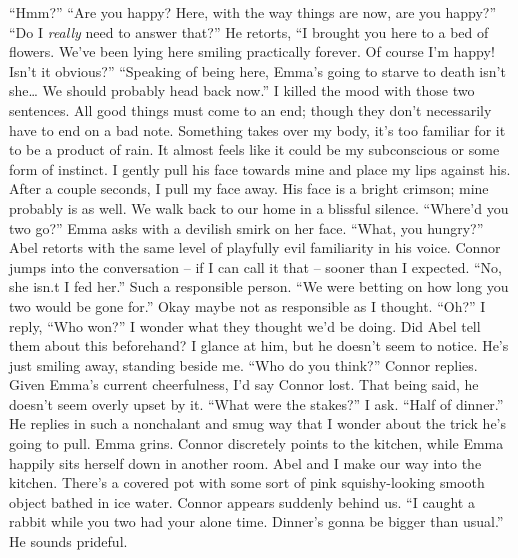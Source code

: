 \documentclass[openany, 12pt]{book}
\newcommand\tab[1][1cm]{\hspace*{#1}}
\begin{document}
\newline
\tab
``Hmm?''
\newline
\tab
``Are you happy? Here, with the way things are now, are you happy?''
\newline
\tab
``Do I \textit{really} need to answer that?'' He retorts, ``I brought you here to a bed of flowers. We’ve been lying here smiling practically forever. Of course I’m happy! Isn’t it obvious?''
\newline
\tab
``Speaking of being here, Emma’s going to starve to death isn’t she… We should probably head back now.'' I killed the mood with those two sentences. All good things must come to an end; though they don’t necessarily have to end on a bad note. Something takes over my body, it’s too familiar for it to be a product of rain. It almost feels like it could be my subconscious or some form of instinct. I gently pull his face towards mine and place my lips against his.  After a couple seconds, I pull my face away. His face is a bright crimson; mine probably is as well. We walk back to our home in a blissful silence.
\newline
\newline
\tab
``Where’d you two go?'' Emma asks with a devilish smirk on her face.
\newline
\tab
``What, you hungry?'' Abel retorts with the same level of playfully evil familiarity in his voice. 
\newline
\tab
Connor jumps into the conversation -- if I can call it that -- sooner than I expected. ``No, she isn.t I fed her.'' Such a responsible person. ``We were betting on how long you two would be gone for.'' Okay maybe not as responsible as I thought.
\newline
\tab
``Oh?'' I reply, ``Who won?'' I wonder what they thought we’d be doing. Did Abel tell them about this beforehand? I glance at him, but he doesn’t seem to notice. He’s just smiling away, standing beside me.
\newline
\tab
``Who do you think?'' Connor replies. Given Emma’s current cheerfulness, I’d say Connor lost. That being said, he doesn’t seem overly upset by it. 
\newline
\tab
``What were the stakes?'' I ask.
\newline
\tab
``Half of dinner.'' He replies in such a nonchalant and smug way that I wonder about the trick he’s going to pull. Emma grins. Connor discretely points to the kitchen, while Emma happily sits herself down in another room. Abel and I make our way into the kitchen. There’s a covered pot with some sort of pink squishy-looking smooth object bathed in ice water. Connor appears suddenly behind us. ``I caught a rabbit while you two had your alone time. Dinner’s gonna be bigger than usual.'' He sounds prideful.
\end{document}
